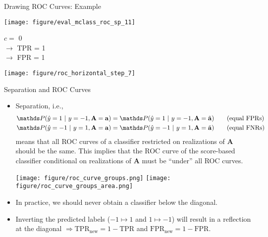 \documentclass[11pt,compress,t,notes=noshow, xcolor=table]{beamer}
\newcommand{\sens}{\mathbf{A}} %
\newcommand{\ba}{\mathbf{a}}
\newcommand{\batilde}{\tilde{\mathbf{a}}}
\begin{document}

\begin{vbframe}{Drawing ROC Curves: Example}
	
	\begin{knitrout}\scriptsize
		\color{fgcolor}
		
		{
			\texttt{[image: figure/eval\_mclass\_roc\_sp\_11]}
		}
		
	\end{knitrout}
	
	\vfill
	
	\begin{minipage}[b]{0.3\textwidth}
		$c =$ 0\\ 
		$\rightarrow$ TPR = 1 \\
		$\rightarrow$ FPR = 1
	\end{minipage}%
	\begin{minipage}[b]{0.7\textwidth}
		\texttt{[image: figure/roc\_horizontal\_step\_7]} 
	\end{minipage}
	
\end{vbframe}


\begin{vbframe}{Separation and ROC Curves}
	\footnotesize{
		\begin{itemize}
			\item Separation, i.e.,
			\begin{align*}
				&\P(  \yh = 1 ~|~ y = -1, \sens = \ba ) = \P(  \yh = 1 ~|~ y=-1, \sens = \batilde ) \tag{equal FPRs}\\
				&\P(  \yh = -1 ~|~ y = 1, \sens = \ba ) = \P(  \yh = -1 ~|~ y=1, \sens = \batilde ) \tag{equal FNRs}
			\end{align*}
			means that all ROC curves of a classifier restricted on realizations of $\sens$ should be the same.
			This implies that the ROC curve of the score-based classifier conditional on realizations of $\sens$ must be
			``under'' all ROC curves.   
			
			\begin{center}
%				
				\texttt{[image: figure/roc\_curve\_groups.png]}
				\texttt{[image: figure/roc\_curve\_groups\_area.png]}
%				
			\end{center}
			
			\item In practice, we should never obtain a classifier below the diagonal.
%			
			\item Inverting the predicted labels ($-1 \mapsto 1$ and $1 \mapsto -1$) will 
			result in a reflection at the diagonal  $\Rightarrow \text{TPR}_{\text{new}} = 1 - \text{TPR}$ and 
			$\text{FPR}_{\text{new}} = 1 - \text{FPR}.$ \\	
		\end{itemize}
	}
\end{vbframe}
\end{document}
